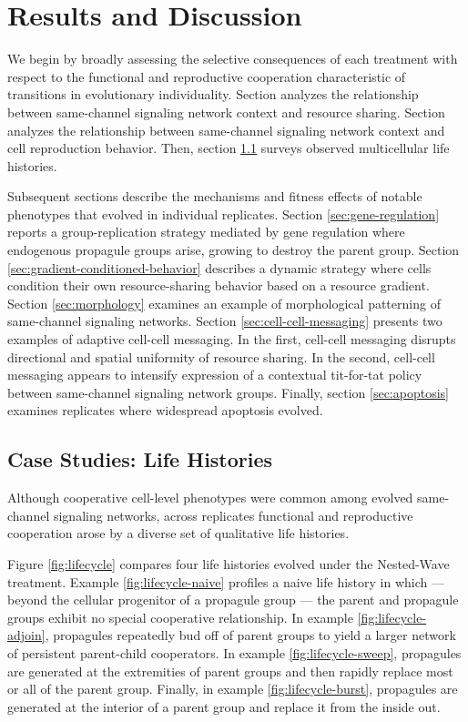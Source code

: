 \section{Results and Discussion}

We begin by broadly assessing the selective consequences of each treatment with respect to the functional and reproductive cooperation characteristic of transitions in evolutionary individuality.
Section \label{sec:reproductive-cooperation} analyzes the relationship between same-channel signaling network context and resource sharing.
Section \label{sec:resource-sharing} analyzes the relationship between same-channel signaling network context and cell reproduction behavior.
Then, section \ref{sec:life-histories} surveys observed multicellular life histories.

Subsequent sections describe the mechanisms and fitness effects of notable phenotypes that evolved in individual replicates.
Section \ref{sec:gene-regulation} reports a group-replication strategy mediated by gene regulation where endogenous propagule groups arise, growing to destroy the parent group.
Section \ref{sec:gradient-conditioned-behavior} describes a dynamic strategy where cells condition their own resource-sharing behavior based on a resource gradient.
Section \ref{sec:morphology} examines an example of morphological patterning of same-channel signaling networks.
Section \ref{sec:cell-cell-messaging} presents two examples of adaptive cell-cell messaging.
In the first, cell-cell messaging disrupts directional and spatial uniformity of resource sharing.
In the second, cell-cell messaging appears to intensify expression of a contextual tit-for-tat policy between same-channel signaling network groups.
Finally, section \ref{sec:apoptosis} examines replicates where widespread apoptosis evolved.

\subsection{Case Studies: Life Histories} \label{sec:life-histories}

Although cooperative cell-level phenotypes were common among evolved same-channel signaling networks, across replicates functional and reproductive cooperation arose by a diverse set of qualitative life histories.


Figure \ref{fig:lifecycle} compares four life histories evolved under the Nested-Wave treatment.
Example \ref{fig:lifecycle-naive} profiles a naive life history in which --- beyond the cellular progenitor of a propagule group --- the parent and propagule groups exhibit no special cooperative relationship.
In example \ref{fig:lifecycle-adjoin}, propagules repeatedly bud off of parent groups to yield a larger network of persistent parent-child cooperators.
In example \ref{fig:lifecycle-sweep}, propagules are generated at the extremities of parent groups and then rapidly replace most or all of the parent group.
Finally, in example \ref{fig:lifecycle-burst}, propagules are generated at the interior of a parent group and replace it from the inside out.

